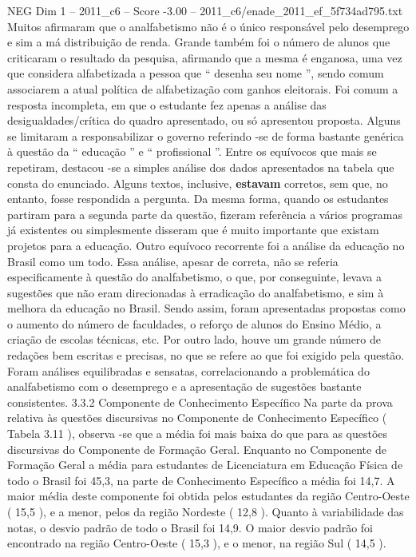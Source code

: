 \begin{textsample}{NEG Dim 1 – 2011\_c6 – Score -3.00 – 2011\_c6/enade\_2011\_ef\_5f734ad795.txt}
Muitos afirmaram que o analfabetismo não é o único responsável pelo desemprego e sim a má distribuição de renda.
Grande também foi o número de alunos que criticaram o resultado da pesquisa, afirmando que a mesma é enganosa, uma vez que considera alfabetizada a pessoa que “ desenha seu nome ”, sendo comum associarem a atual política de alfabetização com ganhos eleitorais.
Foi comum a resposta incompleta, em que o estudante fez apenas a análise das desigualdades/crítica do quadro apresentado, ou só apresentou proposta.
Alguns se limitaram a responsabilizar o governo referindo -se de forma bastante genérica à questão da “ educação ” e “ profissional ”.
Entre os equívocos que mais se repetiram, destacou -se a simples análise dos dados apresentados na tabela que consta do enunciado.
Alguns textos, inclusive, \textbf{estavam} corretos, sem que, no entanto, fosse respondida a pergunta.
Da mesma forma, quando os estudantes partiram para a segunda parte da questão, fizeram referência a vários programas já existentes ou simplesmente disseram que é muito importante que existam projetos para a educação.
Outro equívoco recorrente foi a análise da educação no Brasil como um todo.
Essa análise, apesar de correta, não se referia especificamente à questão do analfabetismo, o que, por conseguinte, levava a sugestões que não eram direcionadas à erradicação do analfabetismo, e sim à melhora da educação no Brasil.
Sendo assim, foram apresentadas propostas como o aumento do número de faculdades, o reforço de alunos do Ensino Médio, a criação de escolas técnicas, etc.
Por outro lado, houve um grande número de redações bem escritas e precisas, no que se refere ao que foi exigido pela questão.
Foram análises equilibradas e sensatas, correlacionando a problemática do analfabetismo com o desemprego e a apresentação de sugestões bastante consistentes. 3.3.2 Componente de Conhecimento Específico Na parte da prova relativa às questões discursivas no Componente de Conhecimento Específico ( Tabela 3.11 ), observa -se que a média foi mais baixa do que para as questões discursivas do Componente de Formação Geral.
Enquanto no Componente de Formação Geral a média para estudantes de Licenciatura em Educação Física de todo o Brasil foi 45,3, na parte de Conhecimento Específico a média foi 14,7.
A maior média deste componente foi obtida pelos estudantes da região Centro-Oeste ( 15,5 ), e a menor, pelos da região Nordeste ( 12,8 ).
Quanto à variabilidade das notas, o desvio padrão de todo o Brasil foi 14,9.
O maior desvio padrão foi encontrado na região Centro-Oeste ( 15,3 ), e o menor, na região Sul ( 14,5 ).

\end{textsample}
